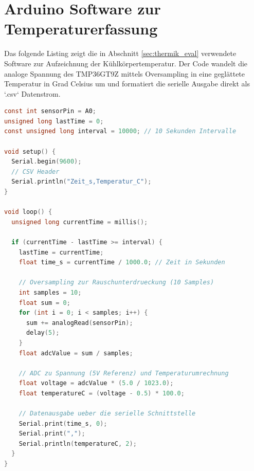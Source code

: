 \section{Arduino Software zur Temperaturerfassung}
\label{app:arduino_code}

Das folgende Listing zeigt die in Abschnitt \ref{sec:thermik_eval} verwendete Software zur Aufzeichnung der Kühlkörpertemperatur. Der Code wandelt die analoge Spannung des TMP36GT9Z mittels Oversampling in eine geglättete Temperatur in Grad Celsius um und formatiert die serielle Ausgabe direkt als `.csv` Datenstrom.
\\

\begin{lstlisting}[language=C, caption=Arduino Nano Firmware für den TMP36-Sensor]
const int sensorPin = A0;
unsigned long lastTime = 0;
const unsigned long interval = 10000; // 10 Sekunden Intervalle

void setup() {
  Serial.begin(9600);
  // CSV Header
  Serial.println("Zeit_s,Temperatur_C");
}

void loop() {
  unsigned long currentTime = millis();

  if (currentTime - lastTime >= interval) {
    lastTime = currentTime;
    float time_s = currentTime / 1000.0; // Zeit in Sekunden

    // Oversampling zur Rauschunterdrueckung (10 Samples)
    int samples = 10;
    float sum = 0;
    for (int i = 0; i < samples; i++) {
      sum += analogRead(sensorPin);
      delay(5);
    }
    float adcValue = sum / samples;

    // ADC zu Spannung (5V Referenz) und Temperaturumrechnung
    float voltage = adcValue * (5.0 / 1023.0);
    float temperatureC = (voltage - 0.5) * 100.0;

    // Datenausgabe ueber die serielle Schnittstelle
    Serial.print(time_s, 0);
    Serial.print(",");
    Serial.println(temperatureC, 2);
  }
}
\end{lstlisting}